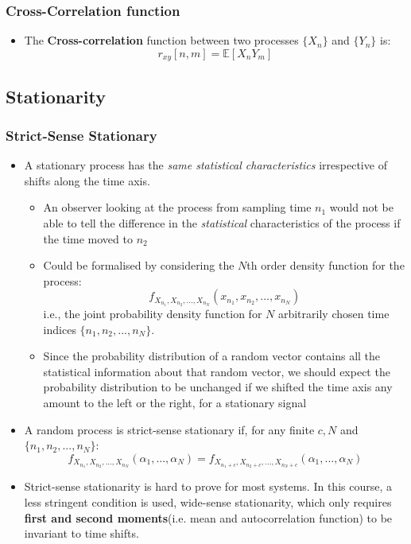 \documentclass[12pt]{article}
\newcommand{\empha}[1]{\textbf{\textcolor{blue1}{#1}}}
\newcommand{\mexp}{\mathbb{E}}
\newcommand{\proc}[1]{\{ #1_n\}}
\newcommand{\crosscoxy}{r_{xy}}
\begin{document}
\subsubsection{Cross-Correlation function}
\begin{itemize}
    \item The \textbf{Cross-correlation} function between two processes $\proc{X}$ and $\proc{Y}$ is:
    \[
    \crosscoxy[n,m] = \mexp[X_n Y_m]
    \]
\end{itemize}
\subsection{Stationarity}
\subsubsection{Strict-Sense Stationary}
\begin{itemize}
    \item A stationary process has the \textit{same statistical characteristics} \textcolor{blue1}{irrespective of shifts along the time axis}.
    \begin{itemize}
        \item An observer looking at the process from sampling time $n_1$ would not be able to tell the difference in the \textit{\textcolor{blue1}{statistical}} characteristics of the process if the time moved to $n_2$
        \item Could be formalised by considering the $N$th order density function for the process:
        \[
        f_{X_{n_1},X_{n_2},...,X_{n_N}}(x_{n_1},x_{n_2},...,x_{n_N})
        \]
        i.e., the joint probability density function for $N$ arbitrarily chosen time indices $\{n_1,n_2,...,n_N\}$.
        \item Since the probability distribution of a random vector contains all the statistical information about that random vector, we should expect the probability distribution to be unchanged if we shifted the time axis any amount to the left or the right, for a stationary signal 
    \end{itemize}
    \item A random process is strict-sense stationary if, for any finite $c, N$ and $\{ n_1,n_2,...,n_N\}$:
    \[
     f_{X_{n_1},X_{n_2},...,X_{n_N}}(\alpha_1,...,\alpha_N) = f_{X_{n_1+c},X_{n_2+c},...,X_{n_N+c}}(\alpha_1,...,\alpha_N)
    \]
    \item Strict-sense stationarity is hard to prove for most systems. In this course, a less stringent condition is used, wide-sense stationarity, which only requires \empha{first and second moments}(i.e. mean and autocorrelation function) to be invariant to time shifts.
\end{itemize}
\end{document}
